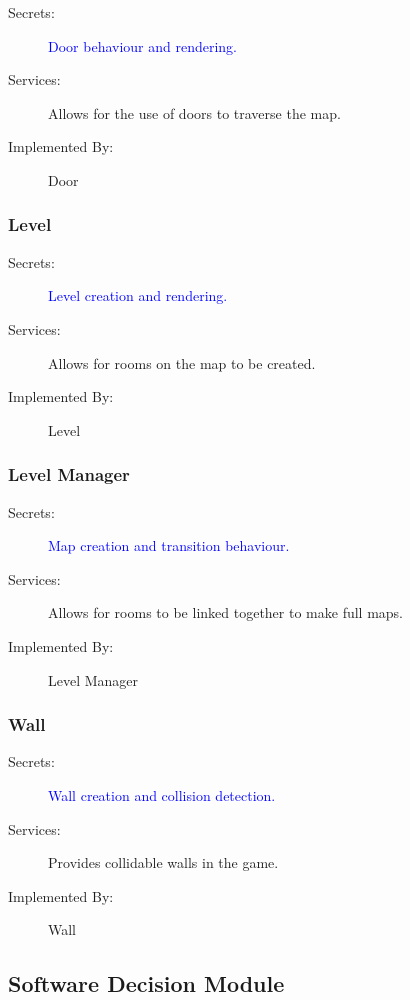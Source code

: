 \documentclass[12pt, titlepage]{article}
\begin{document}
\begin{description}
  \item[Secrets:] \textcolor{blue}{Door behaviour and rendering.}
  \item[Services:] Allows for the use of doors to traverse the map.
  \item[Implemented By:] Door
\end{description}

\subsubsection{Level}

\begin{description}
  \item[Secrets:] \textcolor{blue}{Level creation and rendering.}
  \item[Services:] Allows for rooms on the map to be created.
  \item[Implemented By:] Level
\end{description}

\subsubsection{Level Manager}

\begin{description}
  \item[Secrets:] \textcolor{blue}{Map creation and transition behaviour.}
  \item[Services:] Allows for rooms to be linked together to make full maps. 
  \item[Implemented By:] Level Manager
\end{description}

\subsubsection{Wall}

\begin{description}
  \item[Secrets:] \textcolor{blue}{Wall creation and collision detection.}
  \item[Services:] Provides collidable walls in the game.
  \item[Implemented By:] Wall
\end{description}

\subsection{Software Decision Module}
\end{document}
